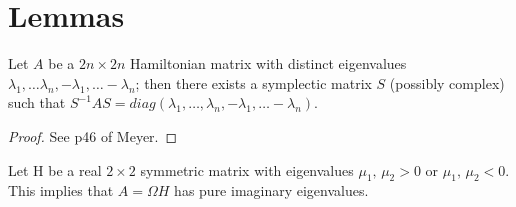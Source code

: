 \section{Lemmas}
\begin{lemma}Let $A$ be a $2n \times 2n$ Hamiltonian matrix with distinct eigenvalues $\lambda_1, \ldots \lambda_n, -\lambda_1, \ldots  -\lambda_n $;  then there exists a symplectic matrix $S$ (possibly complex) such that $S^{-1}AS = diag(\lambda_1, \ldots, \lambda_n,-\lambda_1, \ldots -\lambda_n)$.
\end{lemma} \label{lem:2n2n}
\begin{proof}
See p46 of Meyer.
\end{proof}
\begin{comment}
\begin{lemma}Let A be a real $2 \times 2$ Hamiltonian matrix with eigenvalues $\pm\beta i$, $\beta \neq 0$. Then there exists a real $2 \times 2$ symplectic matrix $S$ such that:
\begin{equation}
S^{-1}AS = \begin{pmatrix} 0 & \beta \\ -\beta & 0 \end{pmatrix} \quad or \quad S^{-1}AS = \begin{pmatrix} 0 & -\beta \\ \beta & 0  \end{pmatrix}
\end{equation} \label{lem:real22}
\end{lemma}
\begin{proof}
See p47 Meyer.
\end{proof}
Possibly not needed.
\end{comment}
\begin{lemma}Let H be a real $2\times 2$ symmetric matrix with eigenvalues $\mu_1, \, \mu_2 > 0$ or $\mu_1, \, \mu_2 < 0$. This implies that $A=\Omega H$ has pure imaginary eigenvalues. \label{lem:htoa} \end{lemma} 
